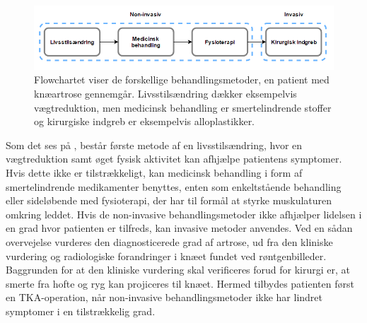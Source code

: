 \begin{figure}[H]
	\centering
	\includegraphics[width=1\textwidth]{figures/bProblemanalyse/flowchart_behandlingsforloeb_rettet.png}
	\caption{Flowchartet viser de forskellige behandlingsmetoder, en patient med knæartrose gennemgår. Livsstilsændring dækker eksempelvis vægtreduktion, men medicinsk behandling er smertelindrende stoffer og kirurgiske indgreb er eksempelvis alloplastikker. \citep{Lind2016b}}
	\label{fig:flow_behandlingsfaser}
\end{figure}\vspace{-.25cm}

Som det ses på , består første metode af en livsstilsændring, hvor en vægtreduktion samt øget fysisk aktivitet kan afhjælpe patientens symptomer. Hvis dette ikke er tilstrækkeligt, kan medicinsk behandling i form af smertelindrende medikamenter benyttes, enten som enkeltstående behandling eller sideløbende med fysioterapi, der har til formål at styrke muskulaturen omkring leddet. Hvis de non-invasive behandlingsmetoder ikke afhjælper lidelsen i en grad hvor patienten er tilfreds, kan invasive metoder anvendes. Ved en sådan overvejelse vurderes den diagnosticerede grad af artrose, ud fra den kliniske vurdering og radiologiske forandringer i knæet fundet ved røntgenbilleder. Baggrunden for at den kliniske vurdering skal verificeres forud for kirurgi er, at smerte fra hofte og ryg kan projiceres til knæet. Hermed tilbydes patienten først en TKA-operation, når non-invasive behandlingsmetoder ikke har lindret symptomer i en tilstrækkelig grad. \citep{brostrom2012}


